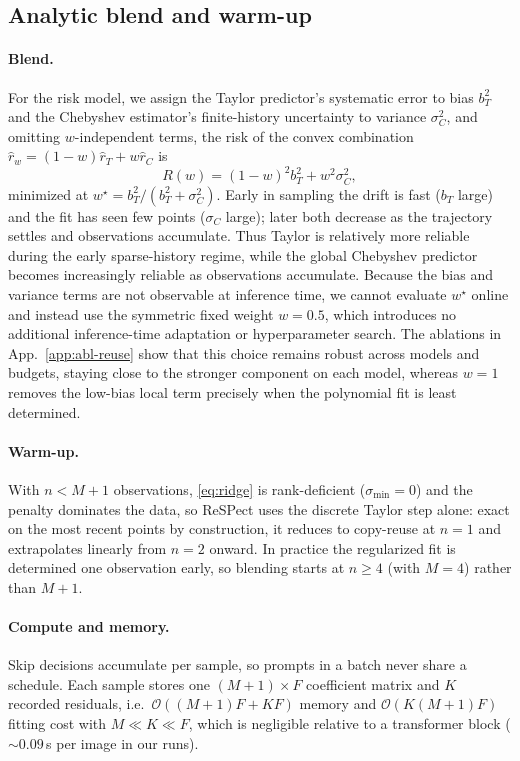 \documentclass{article} %
\begin{document}
\subsection{Analytic blend and warm-up}
\label{sec:blend}

\paragraph{Blend.}
For the risk model, we assign the Taylor predictor's systematic
error to bias $b_T^2$ and the Chebyshev estimator's finite-history
uncertainty to variance $\sigma_C^2$, and omitting
$w$-independent terms, the risk of the
convex combination $\hat{r}_w = (1-w)\hat{r}_T + w\hat{r}_C$ is
\begin{equation}
  R(w) = (1-w)^2 b_T^2 + w^2 \sigma_C^2,
\end{equation}
minimized at $w^\star = b_T^2/(b_T^2 + \sigma_C^2)$. Early in sampling
the drift is fast ($b_T$ large) and the fit has seen few points
($\sigma_C$ large); later both decrease as the trajectory settles and
observations accumulate. Thus Taylor is relatively more reliable
during the early sparse-history regime, while the global Chebyshev
predictor becomes increasingly reliable as observations accumulate.
Because the bias and variance terms are not observable at inference
time, we cannot evaluate $w^\star$ online and instead use the
symmetric fixed weight $w{=}0.5$, which introduces no additional
inference-time adaptation or hyperparameter search. The ablations in
App.~\ref{app:abl-reuse} show that this choice remains robust across
models and budgets, staying close to the stronger component on each
model, whereas $w{=}1$ removes the low-bias local term precisely when
the polynomial fit is least determined.

\paragraph{Warm-up.}
With $n < M{+}1$ observations, \eqref{eq:ridge} is rank-deficient
($\sigma_{\min} = 0$) and the penalty dominates the data, so ReSPect
uses the discrete Taylor step alone: exact on the most recent points
by construction, it reduces to copy-reuse at $n = 1$ and extrapolates
linearly from $n = 2$ onward. In practice the regularized fit is
determined one observation early, so blending starts at $n \ge 4$
(with $M{=}4$) rather than $M{+}1$.
\paragraph{Compute and memory.}
Skip decisions accumulate per sample, so prompts in a batch never share
a schedule. Each sample stores one $(M{+}1)\times F$ coefficient matrix
and $K$ recorded residuals, i.e.\ $\mathcal{O}((M{+}1)F + KF)$ memory
and $\mathcal{O}(K(M{+}1)F)$ fitting cost with $M \ll K \ll F$, which
is negligible relative to a transformer block (${\sim}0.09$\,s per image
in our runs).
\end{document}
